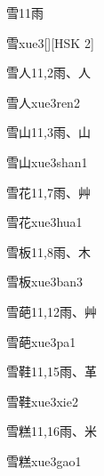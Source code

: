 \begin{Entry}{雪}{11}{⾬}
  \begin{Phonetics}{雪}{xue3}[][HSK 2]
  \end{Phonetics}
\end{Entry}

\begin{Entry}{雪人}{11,2}{⾬、⼈}
  \begin{Phonetics}{雪人}{xue3ren2}
  \end{Phonetics}
\end{Entry}

\begin{Entry}{雪山}{11,3}{⾬、⼭}
  \begin{Phonetics}{雪山}{xue3shan1}
  \end{Phonetics}
\end{Entry}

\begin{Entry}{雪花}{11,7}{⾬、⾋}
  \begin{Phonetics}{雪花}{xue3hua1}
  \end{Phonetics}
\end{Entry}

\begin{Entry}{雪板}{11,8}{⾬、⽊}
  \begin{Phonetics}{雪板}{xue3ban3}
  \end{Phonetics}
\end{Entry}

\begin{Entry}{雪葩}{11,12}{⾬、⾋}
  \begin{Phonetics}{雪葩}{xue3pa1}
  \end{Phonetics}
\end{Entry}

\begin{Entry}{雪鞋}{11,15}{⾬、⾰}
  \begin{Phonetics}{雪鞋}{xue3xie2}
  \end{Phonetics}
\end{Entry}

\begin{Entry}{雪糕}{11,16}{⾬、⽶}
  \begin{Phonetics}{雪糕}{xue3gao1}
  \end{Phonetics}
\end{Entry}

